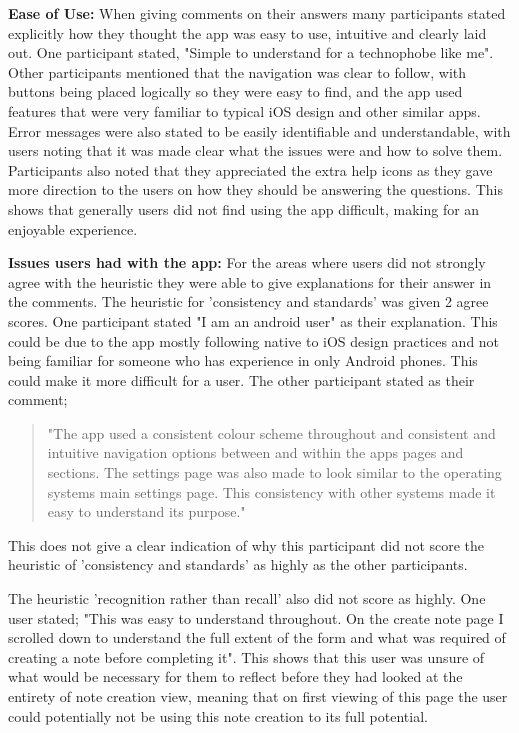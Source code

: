 \documentclass{l4proj}
\begin{document}
\textbf{Ease of Use:} When giving comments on their answers many participants stated explicitly how they thought the app was easy to use, intuitive and clearly laid out. One participant stated, "Simple to understand for a technophobe like me". Other participants mentioned that the navigation was clear to follow, with buttons being placed logically so they were easy to find, and the app used features that were very familiar to typical iOS design and other similar apps. Error messages were also stated to be easily identifiable and understandable, with users noting that it was made clear what the issues were and how to solve them. Participants also noted that they appreciated the extra help icons as they gave more direction to the users on how they should be answering the questions. This shows that generally users did not find using the app difficult, making for an enjoyable experience. 

\textbf{Issues users had with the app:} For the areas where users did not strongly agree with the heuristic they were able to give explanations for their answer in the comments. The heuristic for 'consistency and standards' was given 2 agree scores. One participant stated "I am an android user" as their explanation. This could be due to the app mostly following native to iOS design practices and not being familiar for someone who has experience in only Android phones. This could make it more difficult for a user. The other participant stated as their comment; \begin{quotation}"The app used a consistent colour scheme throughout and consistent and intuitive navigation options between and within the apps pages and sections. The settings page was also made to look similar to the operating systems main settings page. This consistency with other systems made it easy to understand its purpose."\end{quotation} This does not give a clear indication of why this participant did not score the heuristic of 'consistency and standards' as highly as the other participants.

The heuristic 'recognition rather than recall' also did not score as highly. One user stated; "This was easy to understand throughout. On the create note page I scrolled down to understand the full extent of the form and what was required of creating a note before completing it". This shows that this user was unsure of what would be necessary for them to reflect before they had looked at the entirety of note creation view, meaning that on first viewing of this page the user could potentially not be using this note creation to its full potential. 
\end{document}
